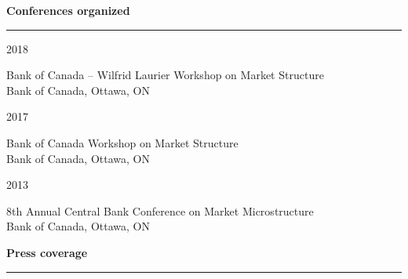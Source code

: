 \documentclass[11pt,letterpaper]{article}
\begin{document}

\bigskip
\noindent \textbf{Conferences organized}
\hrule

\medskip
\noindent
\begin{minipage}[ht]{0.15\textwidth}
2018 \\

\end{minipage}
\begin{minipage}[ht]{0.80\textwidth}
Bank of Canada -- Wilfrid Laurier Workshop on Market Structure \\
Bank of Canada, Ottawa, ON
\end{minipage}

\medskip
\noindent
\begin{minipage}[ht]{0.15\textwidth}
2017 \\

\end{minipage}
\begin{minipage}[ht]{0.80\textwidth}
Bank of Canada Workshop on Market Structure \\
Bank of Canada, Ottawa, ON
\end{minipage}

\medskip
\noindent
\begin{minipage}[ht]{0.15\textwidth}
2013 \\

\end{minipage}
\begin{minipage}[ht]{0.80\textwidth}
8th Annual Central Bank Conference on Market Microstructure \\
Bank of Canada, Ottawa, ON
\end{minipage}


\bigskip
\noindent \textbf{Press coverage}
\hrule

\bigskip
\end{document}
